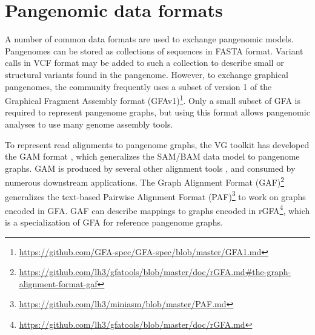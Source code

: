 \section{Pangenomic data formats}
\label{sec:formats}

A number of common data formats are used to exchange pangenomic models.
Pangenomes can be stored as collections of sequences in FASTA format.
Variant calls in VCF format \cite{danecek2011variant} may be added to such a collection to describe small or structural variants found in the pangenome.
However, to exchange graphical pangenomes, the community frequently uses a subset of version 1 of the Graphical Fragment Assembly format (GFAv1)\footnote{\url{https://github.com/GFA-spec/GFA-spec/blob/master/GFA1.md}}.
Only a small subset of GFA is required to represent pangenome graphs, but using this format allows pangenomic analyses to use many genome assembly tools.

To represent read alignments to pangenome graphs, the \textsc{VG} toolkit has developed the GAM format \cite{Garrison_2018}, which generalizes the SAM/BAM \cite{Li_2009} data model to pangenome graphs.
GAM is produced by several other alignment tools \cite{Rautiainen_2019b,Jain_2019a}, and consumed by numerous downstream applications.
The Graph Alignment Format (GAF)\footnote{\url{https://github.com/lh3/gfatools/blob/master/doc/rGFA.md\#the-graph-alignment-format-gaf}} generalizes the text-based Pairwise Alignment Format (PAF)\footnote{\url{https://github.com/lh3/miniasm/blob/master/PAF.md}} to work on graphs encoded in GFA.
GAF can describe mappings to graphs encoded in rGFA\footnote{\url{https://github.com/lh3/gfatools/blob/master/doc/rGFA.md}}, which is a specialization of GFA for reference pangenome graphs.
